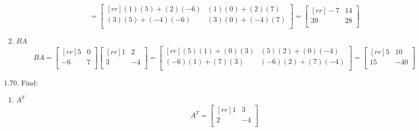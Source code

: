\documentclass[12pt]{article}
\begin{document}
\begin{enumerate}
\begin{enumerate}
\[			= \begin{bmatrix}[rr] (1)(5)+(2)(-6) & (1)(0)+(2)(7)\\
								  (3)(5)+(-4)(-6) & (3)(0)+(-4)(7)\\ \end{bmatrix}
			= \begin{bmatrix}[rr] -7 & 14\\ 39 & 28\\ \end{bmatrix} \]
	\item $BA$
		\[ 	BA
			= \begin{bmatrix}[rr] 5 & 0\\ -6 & 7\\ \end{bmatrix}
			\begin{bmatrix}[rr] 1 & 2\\ 3 & -4\\ \end{bmatrix}
			= \begin{bmatrix}[rr] (5)(1)+(0)(3) & (5)(2)+(0)(-4)\\
								  (-6)(1)+(7)(3) & (-6)(2)+(7)(-4)\\ \end{bmatrix}
			= \begin{bmatrix}[rr] 5 & 10\\ 15 & -40\\ \end{bmatrix} \]
			
	\end{enumerate}
\item[1.70.] Find:
	\begin{enumerate}
	\item $A^T$
		\[ 	A^T = \begin{bmatrix}[rr] 1 & 3\\ 2 & -4\\ \end{bmatrix} \]
		

\end{enumerate}
\end{enumerate}
\end{document}
